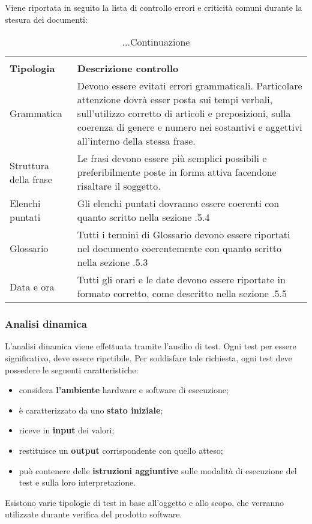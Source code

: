 \noindent Viene riportata in seguito la lista di controllo errori e criticità comuni durante la stesura dei documenti:

\renewcommand{\arraystretch}{2.2}

\begin{longtable}{|C{4cm}|C{8.5cm}|}
	\caption{Tabella per la lista di controllo}\\
	\textbf{Tipologia} & \textbf{Descrizione controllo}\\
	\endfirsthead
	
	\caption[]{...Continuazione}

	\endhead
	
	Grammatica & Devono essere evitati errori grammaticali. Particolare attenzione dovrà esser posta sui tempi verbali, sull'utilizzo corretto di articoli e preposizioni, sulla coerenza di genere e numero nei sostantivi e aggettivi all'interno della stessa frase. \\
	
	Struttura della frase & Le frasi devono essere più semplici possibili e preferibilmente poste in forma attiva facendone risaltare il soggetto. \\
	
	Elenchi puntati & Gli elenchi puntati dovranno essere coerenti con quanto scritto nella sezione .5.4 \\
	
	Glossario & Tutti i termini di Glossario devono essere riportati nel documento coerentemente con quanto scritto nella sezione .5.3 \\
	
	Data e ora & Tutti gli orari e le date devono essere riportate in formato corretto, come descritto nella sezione .5.5 \\
	\hline
\end{longtable}



\subsubsection{Analisi dinamica}
L'analisi dinamica viene effettuata tramite l'ausilio di test. Ogni test per essere significativo, deve essere ripetibile. Per soddisfare tale richiesta, ogni test deve possedere le seguenti caratteristiche:
\begin{itemize}
	\item considera \textbf{l'ambiente} hardware e software di esecuzione;
	\item è caratterizzato da uno \textbf{stato iniziale};
	\item riceve in \textbf{input} dei valori;
	\item restituisce un \textbf{output} corrispondente con quello atteso;
	\item può contenere delle \textbf{istruzioni aggiuntive} sulle modalità di esecuzione del test e sulla loro interpretazione.
\end{itemize}
Esistono varie tipologie di test in base all'oggetto e allo scopo, che verranno utilizzate durante verifica del prodotto software.

